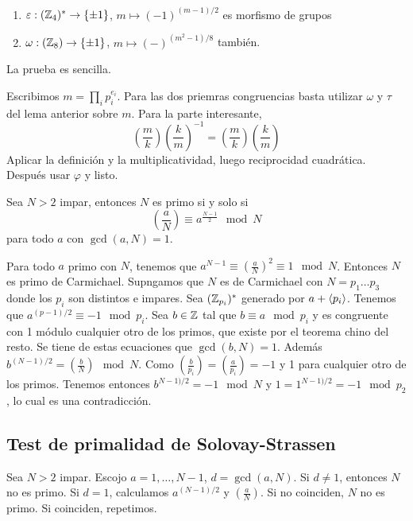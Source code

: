 \documentclass[CR.tex]{subfiles}
\begin{document}
\begin{lemma}
\begin{enumerate}
\item $\varepsilon:(\mathbb{Z}_4)^*\to \{\pm 1\}$, $m\mapsto (-1)^{(m-1)/2}$ es morfismo de grupos
\item $\omega:(\mathbb{Z}_8)\to\{\pm 1\}$, $m\mapsto (-)^{(m^2-1)/8}$ también.
\end{enumerate}
\end{lemma}
La prueba es sencilla. 

\begin{dem}
Escribimos $m=\prod_i p_i^{e_i}$. Para las dos priemras congruencias basta utilizar $\omega$ y $\tau$ del lema anterior sobre $m$. Para la parte interesante, 
\[
(\frac{m}{k})(\frac{k}{m})^{-1}=(\frac{m}{k})(\frac{k}{m})
\]
Aplicar la definición y la multiplicatividad, luego reciprocidad cuadrática. Después usar $\varphi$ y listo. 
\end{dem}

\begin{prop}
Sea $N>2$ impar, entonces $N$ es primo si y solo si 
\[
\left(\frac{a}{N}\right)\equiv a^{\frac{N-1}{2}}\mod N
\]
para todo $a$ con $\gcd(a,N)=1$.
\end{prop}
\begin{dem}
Para todo $a$ primo con $N$, tenemos que $a^{N-1}\equiv (\frac{a}{N})^2\equiv 1\mod N$. Entonces $N$ es primo de Carmichael. Supngamos que $N$ es de Carmichael con $N=p_1\dots p_3$ donde los $p_i$ son distintos e impares. Sea $(\mathbb{Z}_{p_i})^*$ generado por $a+\langle{p_i}\rangle$. Tenemos que $a^{(p-1)/2}\equiv -1\mod p_i$. Sea $b\in\mathbb{Z}$ tal que $b\equiv a\mod p_i$ y es congruente con 1 módulo cualquier otro de los primos, que existe por el teorema chino del resto. Se tiene de estas ecuaciones que $\gcd(b,N)=1$. Además $b^{(N-1)/2}=(\frac{b}{N})\mod N$. Como $(\frac{b}{p_i})=(\frac{a}{p_i})=-1$ y 1 para cualquier otro de los primos. Tenemos entonces  $b^{N-1)/2}=-1\mod N$ y $1=1^{N-1)/2}=-1\mod p_2$, lo cual es una contradicción.
\end{dem}

\subsection{Test de primalidad de Solovay-Strassen}
Sea $N>2$ impar. Escojo $a=1,\dots, N-1$, $d=\gcd(a,N)$. Si $d\neq 1$, entonces $N$ no es primo. Si $d=1$, calculamos $a^{(N-1)/2}$ y $(\frac{a}{N})$. Si no coinciden, $N$ no es primo. Si coinciden, repetimos.
\end{document}
